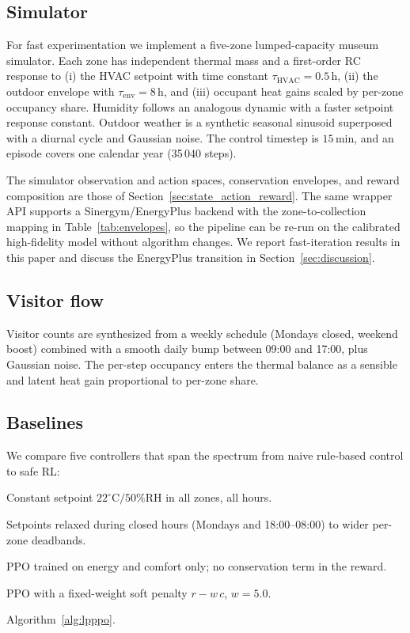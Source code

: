 \subsection{Simulator}\label{sec:simulator}

For fast experimentation we implement a five-zone lumped-capacity
museum simulator. Each zone has independent thermal mass and a
first-order RC response to (i) the HVAC setpoint with time constant
$\tau_{\text{HVAC}}=0.5\,\mathrm{h}$, (ii) the outdoor envelope with
$\tau_{\text{env}}=8\,\mathrm{h}$, and (iii) occupant heat gains scaled
by per-zone occupancy share. Humidity follows an analogous dynamic with
a faster setpoint response constant. Outdoor weather is a synthetic
seasonal sinusoid superposed with a diurnal cycle and Gaussian noise.
The control timestep is $15\,\mathrm{min}$, and an episode covers one
calendar year (35\,040 steps).

The simulator observation and action spaces, conservation envelopes,
and reward composition are those of
Section~\ref{sec:state_action_reward}. The same wrapper API supports a
Sinergym/EnergyPlus backend with the zone-to-collection mapping in
Table~\ref{tab:envelopes}, so the pipeline can be re-run on the
calibrated high-fidelity model without algorithm changes. We report
fast-iteration results in this paper and discuss the EnergyPlus
transition in Section~\ref{sec:discussion}.

\subsection{Visitor flow}

Visitor counts are synthesized from a weekly schedule (Mondays closed,
weekend boost) combined with a smooth daily bump between 09:00 and
17:00, plus Gaussian noise. The per-step occupancy enters the thermal
balance as a sensible and latent heat gain proportional to per-zone
share.

\subsection{Baselines}

We compare five controllers that span the spectrum from naive rule-based
control to safe RL:

\begin{description}[leftmargin=1.2em,style=nextline,nosep]
  \item[B1: Rule-fixed.] Constant setpoint $22^\circ\mathrm{C}/50\%\mathrm{RH}$ in all zones, all hours.
  \item[B2: Schedule.] Setpoints relaxed during closed hours (Mondays
        and 18:00--08:00) to wider per-zone deadbands.
  \item[B3: Vanilla-PPO.] PPO trained on energy and comfort only; no
        conservation term in the reward.
  \item[B4: Soft-PPO.] PPO with a fixed-weight soft penalty
        $r-w\,c$, $w=5.0$.
  \item[B5: Lagrangian-PPO (ours).] Algorithm~\ref{alg:lpppo}.
\end{description}

